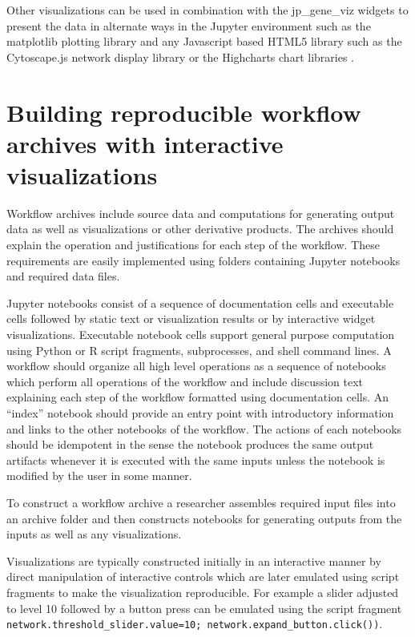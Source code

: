 \documentclass[10pt,letterpaper]{article}
\begin{document}
Other visualizations can be used in combination with the jp\_gene\_viz 
widgets to present the data in alternate ways in the Jupyter environment 
such as the matplotlib plotting library \cite{matplotlib} and any 
Javascript based HTML5 library such as the Cytoscape.js \cite{cytoscapejs} 
network display library or the Highcharts chart libraries \cite{highcharts}.

\section{Building reproducible workflow archives with interactive visualizations}

Workflow archives include source data and computations for generating output 
data as well as visualizations or other derivative products.  The archives 
should explain the operation and justifications for each step of the workflow.
These requirements are easily implemented using folders containing Jupyter 
notebooks and required data files.

Jupyter notebooks consist of a sequence of documentation cells and executable cells
followed by static text or visualization results or by interactive widget visualizations.
Executable notebook cells
support general purpose computation using Python or R script fragments, 
subprocesses, and shell command lines.  A workflow should organize all high level 
operations as a sequence of notebooks which perform all operations of the workflow 
and include discussion text explaining each step of the workflow formatted using 
documentation cells.  An “index” notebook should provide an entry point with 
introductory information and links to the other notebooks of the workflow.  
The actions of each notebooks should be idempotent in the sense the notebook 
produces the same output artifacts whenever it is executed with the same inputs 
unless the notebook is modified by the user in some manner.

To construct a workflow archive a researcher assembles required input files into 
an archive folder and then constructs notebooks for generating outputs from the 
inputs as well as any visualizations.  

Visualizations are typically constructed initially 
in an interactive manner by direct manipulation of interactive
controls which are later emulated using script fragments to make the visualization
reproducible. For example a slider adjusted to level 10 followed
by a  button press can be emulated using the script fragment
\texttt{network.threshold\_slider.value=10; network.expand\_button.click())}.
\end{document}
